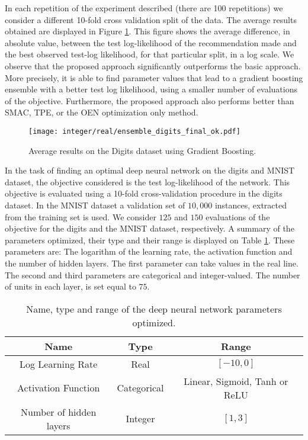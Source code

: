 In each repetition of the experiment described (there are 100 repetitions) we consider a different 10-fold 
cross validation split of the data. The average results obtained are displayed in Figure \ref{fig:results_digits}.
This figure shows the average difference, in absolute value, between the test log-likelihood of the 
recommendation made and the best observed test-log likelihood, for that particular split, in a log scale. 
We observe that the proposed approach significantly outperforms the basic approach. More precisely, it is able
to find parameter values that lead to a gradient boosting ensemble with a better test log likelihood,
using a smaller number of evaluations of the objective. Furthermore, the proposed approach also performs
better than SMAC, TPE, or the OEN optimization only method.

\begin{figure}[htb]
        \begin{center}
        \texttt{[image: integer/real/ensemble\_digits\_final\_ok.pdf]} \\
        \end{center}
\caption{{\small Average results on the Digits dataset using Gradient Boosting.}}
\label{fig:results_digits}
\end{figure}

In the task of finding an optimal deep neural network on the digits and MNIST dataset, the objective considered is 
the test log-likelihood of the network.  This objective is evaluated using a 10-fold cross-validation procedure in the 
digits dataset.  In the MNIST dataset a validation set of $10,000$ instances, extracted from the training set is used.
We consider $125$ and $150$ evaluations of the objective for the digits and the MNIST dataset, respectively. 
A summary of the parameters optimized, their type and their range is displayed on Table \ref{table:2}. These parameters 
are: The logarithm of the learning rate, the activation function and the number of hidden 
layers. The first parameter can take values in the real line. The second and third 
parameters are categorical and integer-valued. The number of units in each layer, is set
equal to $75$.

\begin{table}[htb]
\centering
\caption{Name, type and range of the deep neural network parameters optimized.}
\begin{tabular}{ c | c | c }
 \hline
 {\bf Name} & {\bf Type} & {\bf Range} \\
 \hline
 Log Learning Rate & Real & $[-10,0]$ \\
 Activation Function & Categorical & Linear, Sigmoid, Tanh or ReLU \\
 Number of hidden layers & Integer & $[1,3]$ \\
 \hline
\end{tabular}
\label{table:2}
\end{table}

